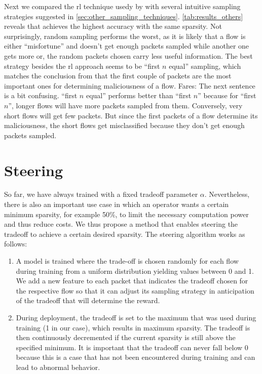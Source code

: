 \documentclass[conference]{IEEEtran}
\newcommand\note[2]{{\color{#1}#2}}
\begin{document}
Next we compared the \gls{rl} technique usedy by \ours{} with several intuitive sampling strategies suggested in \autoref{sec:other_sampling_techniques}. 
\autoref{tab:results_others} reveals that \ours{} achieves the highest accuracy with the same sparsity. Not surprisingly, random sampling performs the worst, as it is likely that a flow is either ``misfortune'' and doesn't get enough packets sampled while another  one gets more or, the random packets chosen carry less useful information. The best strategy besides the \gls{rl} approach seems to be ``first $n$ equal'' sampling, which matches the conclusion from \cite{hartl_explainability_2019} that the first couple of packets are the most important ones for determining maliciousness of a flow. 
\note{blue}{Fares: The next sentence is a bit confusing.}
``first $n$ equal'' performs better than ``first $n$'' because for ``first $n$'', longer flows will have more packets sampled from them. Conversely, very short flows will get few packets. But since the first packets of a flow determine its maliciousness, the short flows get misclassified because they don't get enough packets sampled. 


\section{Steering}

So far, we have always trained \ours{} with a fixed tradeoff parameter $\alpha$. Nevertheless, there is also an important use case in which an operator wants a certain minimum sparsity, for example 50\%, to limit the necessary computation power and thus reduce costs. 
We thus propose a method that enables steering the tradeoff to achieve a certain desired sparsity. The steering algorithm works as follows:
\begin{enumerate}
\item A model is trained where the trade-off is chosen randomly for each flow during training from a uniform distribution yielding values between 0 and 1. We add a new feature to each packet that indicates the tradeoff chosen for the respective flow so that it can adjust its sampling strategy in anticipation of the tradeoff that will determine the reward.
\item During deployment, the tradeoff is set to the maximum that was used during training (1 in our case), which results in maximum sparsity. The tradeoff is then continuously decremented if the current sparsity is still above the specified minimum. It is important that the tradeoff can never fall below 0 because this is a case that has not been encountered during training and can lead to abnormal behavior. 
\end{enumerate}
\end{document}
